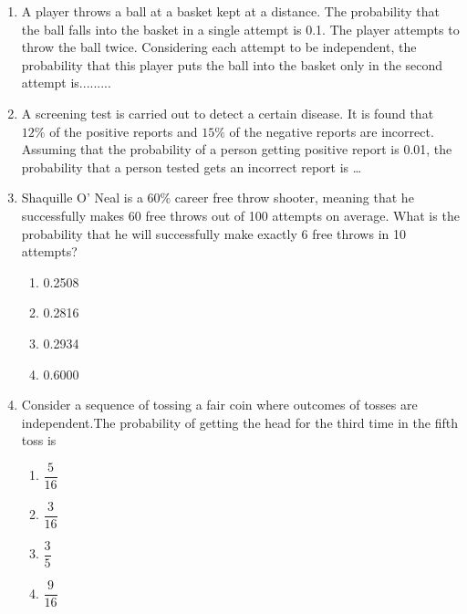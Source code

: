 \documentclass[journal,12pt,twocolumn]{IEEEtran}
\begin{document}
\begin{enumerate}
\item A player throws a ball at a basket kept at a distance. The probability that the ball falls into the basket in a single attempt is 0.1. The player attempts to throw the ball twice. Considering each attempt to be independent, the probability that this player puts the ball into the basket only in the second attempt is.........
\\
\solution

\item A screening test is carried out to detect a certain disease. It is found that $12\%$ of the positive
reports and $15\%$ of the negative reports are incorrect. Assuming that the probability of a
person getting positive report is 0.01, the probability that a person tested gets an incorrect
report is \dots
\\
\solution

%
\item Shaquille O’ Neal is a 60\% career free throw shooter, meaning that he successfully makes 60 free throws out of 100 attempts on average. What is the probability that he will successfully make exactly 6 free throws in 10 attempts?
\begin{enumerate} [label={\Alph*)}]
\item 0.2508
\item 0.2816
\item 0.2934
\item 0.6000
\end{enumerate}
%
\solution

%
\item  Consider a sequence of tossing a fair coin where outcomes of tosses are independent.The probability of getting the head for the third time in the fifth toss is
    \begin{enumerate}[label=(\Alph*)]
      \item $\dfrac{5}{16}$  \item $\dfrac{3}{16}$ \item $\dfrac{3}{5}$ \item $\dfrac{9}{16}$
    \end{enumerate}
    \solution



\end{enumerate}
\end{document}
